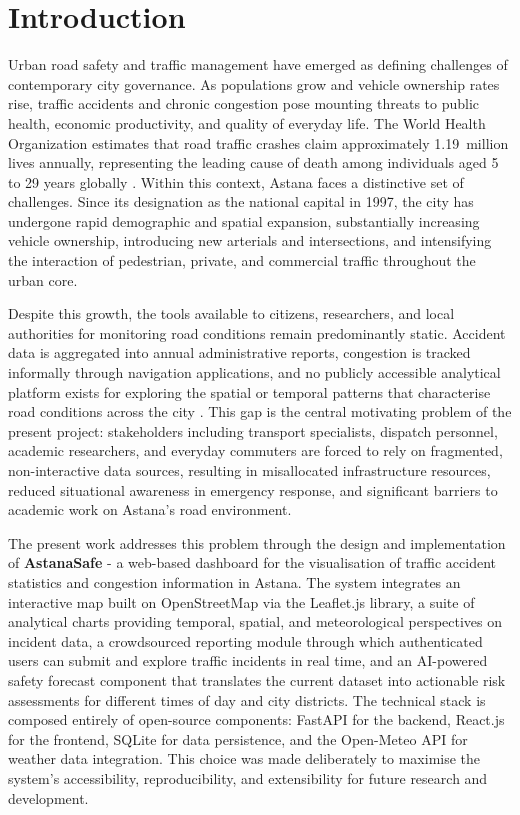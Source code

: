 \documentclass[12pt,a4paper]{report}
\begin{document}
\chapter*{Introduction}

Urban road safety and traffic management have emerged as defining challenges of contemporary city governance. As populations grow and vehicle ownership rates rise, traffic accidents and chronic congestion pose mounting threats to public health, economic productivity, and quality of everyday life. The World Health Organization estimates that road traffic crashes claim approximately 1.19~million lives annually, representing the leading cause of death among individuals aged 5 to 29 years globally \cite{who2023}. Within this context, Astana faces a distinctive set of challenges. Since its designation as the national capital in 1997, the city has undergone rapid demographic and spatial expansion, substantially increasing vehicle ownership, introducing new arterials and intersections, and intensifying the interaction of pedestrian, private, and commercial traffic throughout the urban core.

Despite this growth, the tools available to citizens, researchers, and local authorities for monitoring road conditions remain predominantly static. Accident data is aggregated into annual administrative reports, congestion is tracked informally through navigation applications, and no publicly accessible analytical platform exists for exploring the spatial or temporal patterns that characterise road conditions across the city \cite{kzstat2023}. This gap is the central motivating problem of the present project: stakeholders including transport specialists, dispatch personnel, academic researchers, and everyday commuters are forced to rely on fragmented, non-interactive data sources, resulting in misallocated infrastructure resources, reduced situational awareness in emergency response, and significant barriers to academic work on Astana's road environment.

The present work addresses this problem through the design and implementation of \textbf{AstanaSafe} - a web-based dashboard for the visualisation of traffic accident statistics and congestion information in Astana. The system integrates an interactive map built on OpenStreetMap via the Leaflet.js library, a suite of analytical charts providing temporal, spatial, and meteorological perspectives on incident data, a crowdsourced reporting module through which authenticated users can submit and explore traffic incidents in real time, and an AI-powered safety forecast component that translates the current dataset into actionable risk assessments for different times of day and city districts. The technical stack is composed entirely of open-source components: FastAPI for the backend, React.js for the frontend, SQLite for data persistence, and the Open-Meteo API for weather data integration. This choice was made deliberately to maximise the system's accessibility, reproducibility, and extensibility for future research and development.
\end{document}
